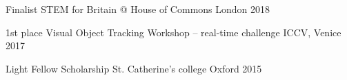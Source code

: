 \begin{cvhonors}

  \cvhonor
    {Finalist} %
    {STEM for Britain @ House of Commons} %
    {London} %
    {2018} %

  \cvhonor
    {1st place} %
    {Visual Object Tracking Workshop -- real-time challenge} %
    {ICCV, Venice} %
    {2017} %

  \cvhonor
    {Light Fellow Scholarship} %
    {St. Catherine's college} %
    {Oxford} %
    {2015} %
\end{cvhonors}
